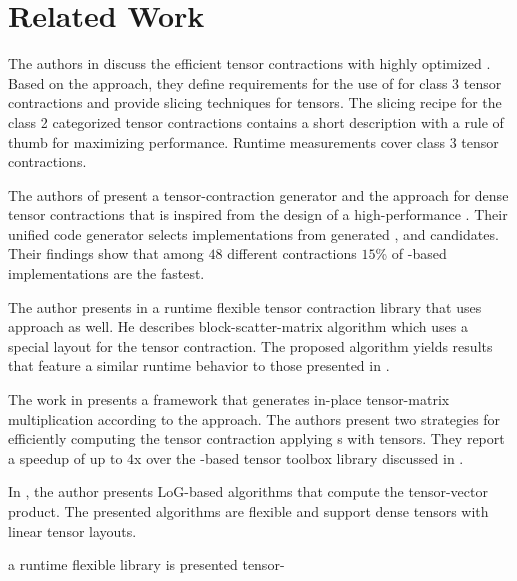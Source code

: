 \section{Related Work}
\label{sec:related}


The authors in \cite{dinapoli:2014:towards.efficient.use} discuss the efficient tensor contractions with highly optimized . 
Based on the  approach, they define requirements for the use of  for class 3 tensor contractions and provide slicing techniques for tensors. %
The slicing recipe for the class 2 categorized tensor contractions contains a short description with a rule of thumb for maximizing performance.
Runtime measurements cover class 3 tensor contractions.

The authors of \cite{springer:2018:design} present a tensor-contraction generator  and the  approach for dense tensor contractions that is inspired from the design of a high-performance .
Their unified code generator selects implementations from generated ,  and  candidates.
Their findings show that among $48$ different contractions $15$\% of -based implementations are the fastest.

The author presents in \cite{matthews:2018:high} a runtime flexible tensor contraction library that uses  approach as well.
He describes block-scatter-matrix algorithm which uses a special layout for the tensor contraction.
The proposed algorithm yields results that feature a similar runtime behavior to those presented in \cite{springer:2018:design}.

The work in \cite{li:2015:input} presents a framework that generates in-place tensor-matrix multiplication according to the  approach. 
The authors present two strategies for efficiently computing the tensor contraction applying s with tensors.
They report a speedup of up to $4$x over the -based  tensor toolbox library discussed in \cite{bader:2006:algorithm862}.


In \cite{bassoy:2019:ttv}, the author presents LoG-based algorithms that compute the tensor-vector product. 
The presented algorithms are flexible and support dense tensors with linear tensor layouts.



a runtime flexible library is presented tensor-
